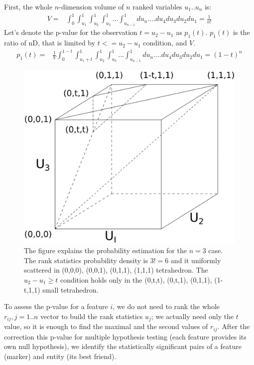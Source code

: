 \documentclass[12pt]{article}
\begin{document}
First, the whole $n$-dimension volume of $n$ ranked variables $u_1 .. u_n$ is:
\begin{eqnarray*}
V = &\displaystyle \int_0^1\int_{u_1}^1\int_{u_2}^1\int_{u_3}^1...\int_{u_{n-1}}^1 du_n....du_4 du_3 du_2 du_1 =  \frac{1}{n!}
\end{eqnarray*}
Let's denote the p-value for the observation $t=u_2-u_1$ as $p_1(t)$. $p_1(t)$ is the ratio of nD, that is limited by $t<=u_2-u_1$ condition, and $V$.
\begin{eqnarray*}
p_1(t) = & \displaystyle\frac{1}{V} \displaystyle \int_0^{1-t}\int_{{u_1}+t}^1\int_{u_2}^1\int_{u_3}^1...\int_{u_{n-1}}^1 du_n....du_4 du_3 du_2 du_1 = (1-t)^n
\end{eqnarray*}
\begin{figure}[h]
\centering
\includegraphics[scale=.4,trim=1in 5in 0 0, clip=true]{rank3d-nocolour}
\caption{The figure explains the probability estimation for the $n=3$ case. The rank statistics probability density is $3!=6$ and it uniformly scattered in (0,0,0), (0,0,1), (0,1,1), (1,1,1) tetrahedron. The $u_2 - u_1 \ge t$ condition holds only in the (0,t,t), (0,t,1), (0,1,1), (1-t,1,1) small tetrahedron.}
\end{figure}
To assess the p-value for a feature $i$, we do not need to rank the whole $r_{ij}, j=1..n$ vector to build the rank statistics $u_j$; we actually need only the $t$ value, so it is enough to find the maximal and the second values of $r_{ij}$. After the correction this p-value for multiple hypothesis testing (each feature provides its own null hypothesis), we identify the statistically significant pairs of a feature (marker) and entity (its best friend).
\end{document}

